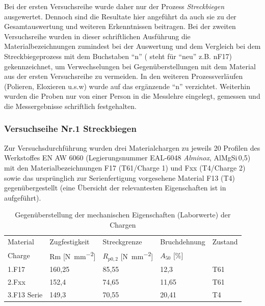 \documentclass[12pt,a4paper,parskip]{scrartcl}
\begin{document}
Bei der ersten Versuchsreihe wurde daher nur der Prozess \emph{Streckbiegen} ausgewertet. Dennoch sind die Resultate hier angeführt da auch sie zu der Gesamtauswertung und weiteren Erkenntnissen beitragen. Bei der zweiten Versuchsreihe wurden in dieser schriftlichen Ausführung die Materialbezeichnungen zumindest bei der Auswertung und dem Vergleich bei dem Streckbiegeprozess mit dem Buchstaben "`n"' ( steht für "`neu"' z.B. nF17) gekennzeichnet, um Verwechselungen bei Gegenüberstellungen mit dem Material aus der ersten Versuchsreihe zu vermeiden. In den weiteren Prozessverläufen (Polieren, Eloxieren u.s.w) wurde auf das ergänzende "`n"' verzichtet. Weiterhin wurden die Proben nur von einer Person in die Messlehre eingelegt, gemessen und die Messergebnisse schriftlich festgehalten.	 	


\subsubsection{Versuchseihe Nr.1 Streckbiegen}
\label{sec:versuchsreihe1}
Zur Versuchsdurchführung wurden drei Materialchargen zu jeweils 20 Profilen des Werkstoffes EN AW 6060 (Legierungsnummer EAL-6048 \emph{Alminox}, AlMgSi\,0,5) mit den Materialbezeichnungen F17 (T61/Charge 1) und Fxx (T4/Charge 2) sowie das ursprünglich zur Serienfertigung vorgesehene Material F13 (T4)  gegenübergestellt (eine Übersicht der relevantesten Eigenschaften ist in  aufgeführt).
\begin{table}[hbtp]
\caption{Gegenüberstellung der mechanischen Eigenschaften (Laborwerte) der Chargen}
\label{tab:chargeneigenschaften}
\centering
\begin{tabular}{lllll}
\toprule
Material & Zugfestigkeit & Streckgrenze & Bruchdehnung & Zustand \\
Charge &  Rm [\si{\newton\per\milli\meter\squared}] &  $R_{p0,2}$ [\si{\newton\per\milli\meter\squared}] &  $A_{50}$ [\%] & \\
\midrule
1.F17 & 160,25 & 85,55 &  12,3  & T61 \\
2.Fxx & 152,4 & 74,65 &   11,65  & T61 \\
3.F13 Serie & 149,3 & 70,55 & 20,41  & T4 \\
\bottomrule




\end{tabular}
\end{table}
\end{document}
